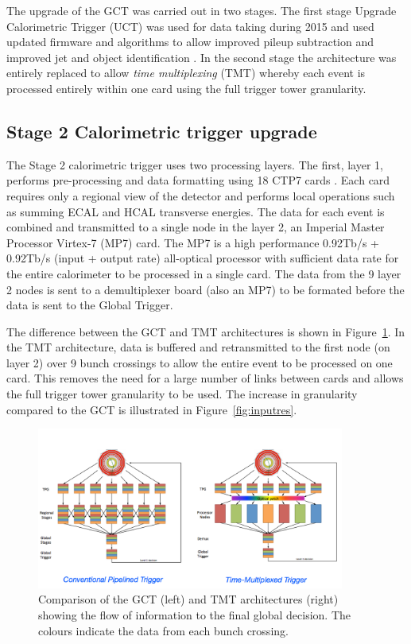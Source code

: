 The upgrade of the GCT was carried out in two stages. The first stage
Upgrade Calorimetric Trigger (UCT) was used for data taking during 2015
and used updated firmware and algorithms to allow improved pileup subtraction 
and improved jet and object identification \cite{uct}. In the second stage the 
architecture was entirely replaced to allow \emph{time multiplexing} (TMT) whereby each
event is processed entirely within one card using the full trigger tower granularity. 

\subsection{Stage 2 Calorimetric trigger upgrade}

The Stage 2 calorimetric trigger uses two processing layers. The first, layer 1, performs
pre-processing and data formatting using 18 CTP7 cards \cite{}. Each card requires
only a regional view of the detector and performs local operations such as summing 
ECAL and HCAL transverse energies. The data for each event is combined and transmitted to 
a single node in the layer 2, an Imperial Master Processor Virtex-7 (MP7) card. 
The MP7 is a high performance 0.92Tb/s + 0.92Tb/s (input + output rate) all-optical processor \cite{mp7}
with sufficient data rate for the entire calorimeter to be processed in a single card. The data 
from the 9 layer 2 nodes is sent to a demultiplexer board (also an MP7) to be formated before
the data is sent to the Global Trigger.

The difference between the GCT and TMT architectures is shown in Figure~\ref{tmux}. 
In the TMT architecture, data is buffered and retransmitted to the first node (on layer 2)
over 9 bunch crossings to allow the entire event to be processed on one card. This
removes the need for a large number of links between cards and allows the full trigger
tower granularity to be used. The increase in granularity compared to the GCT is
illustrated in Figure~\ref{fig:inputres}. 

\begin{figure}

\centering
    \includegraphics[width=0.9\textwidth]{./Figures/triggerUpgrade/tmux}
  \caption{Comparison of the GCT (left) and TMT architectures (right) showing the flow of information
  to the final global decision. The colours indicate the data from each bunch crossing. \cite{tmt}}
  \label{tmux}
\end{figure}

